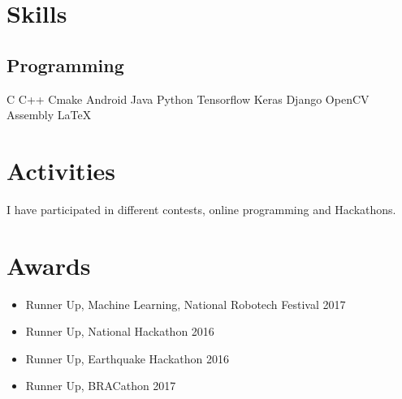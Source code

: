 \documentclass[]{deedy-resume-openfont}
\begin{document}
\begin{minipage}[t]{0.33\textwidth}
\section{Skills}
\subsection{Programming}
C \textbullet{}   C++ \textbullet{} Cmake \textbullet{} Android \textbullet{} Java \textbullet{}
Python \textbullet{} Tensorflow \textbullet{} Keras \textbullet{} Django \textbullet{} OpenCV \textbullet{}   \textbullet{} Assembly \textbullet{} \LaTeX\ \\ 


\section{Activities} 
I have participated in different  contests, online programming and Hackathons.
\sectionsep
\section{Awards}
\begin{itemize}
    \item {} Runner Up, Machine
Learning, National Robotech Festival 2017
\item {}Runner Up, National Hackathon 2016
\item {} Runner Up, Earthquake Hackathon 2016
\item {} Runner Up, BRACathon 2017
\end{itemize}



\sectionsep





%
%

\end{minipage} 
\hfill
\end{document}
